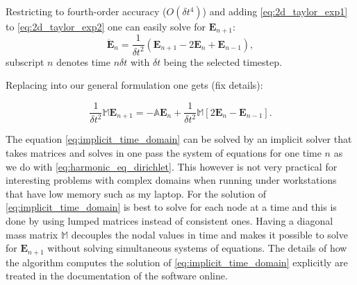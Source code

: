 Restricting to fourth-order accuracy ($O(\delta t^4)$) and  adding \ref{eq:2d_taylor_exp1} to \ref{eq:2d_taylor_exp2} one can easily solve for $\mathbf{E}_{n+1}$:
\begin{equation}
\ddot{\mathbf{E}}_n = \frac{1}{\delta t^2}\left(\mathbf{E}_{n+1}-2 \mathbf{E}_{n} + \mathbf{E}_{n-1}\right),
\label{eq:central-difference}
\end{equation}
subscript $n$ denotes time $n\delta t$ with $\delta t$ being the selected timestep.

Replacing into our general formulation one gets (fix details):

\begin{equation}
\frac{1}{\delta t^2} \mathbb{M} \mathbf{E}_{n+1} = - \mathbb{A}\mathbf{E}_n + \frac{1}{\delta t^2}\mathbb{M}\left[2
\mathbf{E}_{n}-\mathbf{E}_{n-1}
\right]. 	 
\label{eq:implicit_time_domain}
\end{equation}

The equation \ref{eq:implicit_time_domain} can be solved by an implicit solver that takes matrices and solves in one pass the system of equations for one time $n$ as we do with \ref{eq:harmonic_eq_dirichlet}. This however is not very practical for interesting problems with complex domains when running under workstations that have low memory such as my laptop. For the solution of \ref{eq:implicit_time_domain} is best to solve for each node at a time and this is done by using lumped matrices instead of consistent ones. Having a diagonal mass matrix $\mathbb{M}$ decouples the nodal values in time and makes it possible to solve for $\mathbf{E}_{n+1}$ without solving simultaneous systems of equations. The details of how the algorithm computes the solution of \ref{eq:implicit_time_domain} explicitly are treated in the documentation of the software online.
